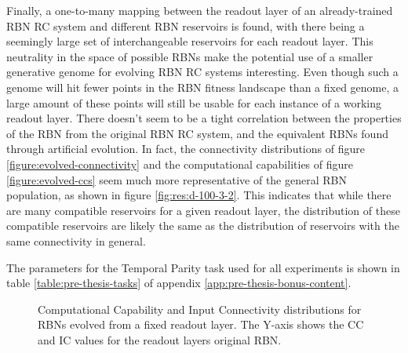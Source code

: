 Finally, a one-to-many mapping between the readout layer of an already-trained RBN RC system and different RBN reservoirs is found,
with there being a seemingly large set of interchangeable reservoirs for each readout layer.
This neutrality in the space of possible RBNs make the potential use of a smaller generative genome for evolving RBN RC systems interesting.
Even though such a genome will hit fewer points in the RBN fitness landscape than a fixed genome,
a large amount of these points will still be usable for each instance of a working readout layer.
There doesn't seem to be a tight correlation between the properties of the RBN from the original RBN RC system,
and the equivalent RBNs found through artificial evolution.
In fact, the connectivity distributions of figure \ref{figure:evolved-connectivity} and the computational capabilities of figure \ref{figure:evolved-ccs} seem much more representative of the general RBN population, as shown in figure \ref{fig:res:d-100-3-2}.
This indicates that while there are many compatible reservoirs for a given readout layer,
the distribution of these compatible reservoirs are likely the same as the distribution of reservoirs with the same connectivity in general.

The parameters for the Temporal Parity task used for all experiments is shown in table \ref{table:pre-thesis-tasks} of appendix \ref{app:pre-thesis-bonus-content}.

\begin{figure}[ht]
    \centering
    \caption[Computational capability and input connectivity for evolved RBNs]{
        Computational Capability and Input Connectivity distributions for RBNs evolved from a fixed readout layer.
        The Y-axis shows the CC and IC values for the readout layers original RBN.
    }
\end{figure}

